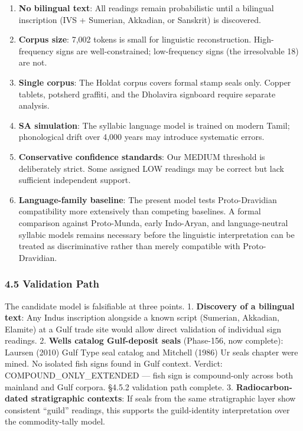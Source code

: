 \documentclass[
]{article}
\providecommand{\tightlist}{%
  \setlength{\itemsep}{0pt}\setlength{\parskip}{0pt}}
\begin{document}
\begin{enumerate}
\def\labelenumi{\arabic{enumi}.}
\tightlist
\item
  \textbf{No bilingual text}: All readings remain probabilistic until a
  bilingual inscription (IVS + Sumerian, Akkadian, or Sanskrit) is
  discovered.
\item
  \textbf{Corpus size}: 7,002 tokens is small for linguistic
  reconstruction. High-frequency signs are well-constrained;
  low-frequency signs (the irresolvable 18) are not.
\item
  \textbf{Single corpus}: The Holdat corpus covers formal stamp seals
  only. Copper tablets, potsherd graffiti, and the Dholavira signboard
  require separate analysis.
\item
  \textbf{SA simulation}: The syllabic language model is trained on
  modern Tamil; phonological drift over 4,000 years may introduce
  systematic errors.
\item
  \textbf{Conservative confidence standards}: Our MEDIUM threshold is
  deliberately strict. Some assigned LOW readings may be correct but
  lack sufficient independent support.
\item
  \textbf{Language-family baseline}: The present model tests Proto-Dravidian
  compatibility more extensively than competing baselines. A formal comparison
  against Proto-Munda, early Indo-Aryan, and language-neutral syllabic models
  remains necessary before the linguistic interpretation can be treated as
  discriminative rather than merely compatible with Proto-Dravidian.
\end{enumerate}

\subsubsection{4.5 Validation Path}\label{validation-path}

The candidate model is falsifiable at three points. 1. \textbf{Discovery of
a bilingual text}: Any Indus inscription alongside a known script
(Sumerian, Akkadian, Elamite) at a Gulf trade site would allow direct
validation of individual sign readings. 2. \textbf{Wells catalog
Gulf-deposit seals} (Phase-156, now complete): Laursen (2010) Gulf Type
seal catalog and Mitchell (1986) Ur seals chapter were mined. No
isolated fish signs found in Gulf context. Verdict:
COMPOUND\_ONLY\_EXTENDED --- fish sign is compound-only across both
mainland and Gulf corpora. §4.5.2 validation path complete. 3.
\textbf{Radiocarbon-dated stratigraphic contexts}: If seals from the
same stratigraphic layer show consistent ``guild'' readings, this
supports the guild-identity interpretation over the commodity-tally
model.
\end{document}
